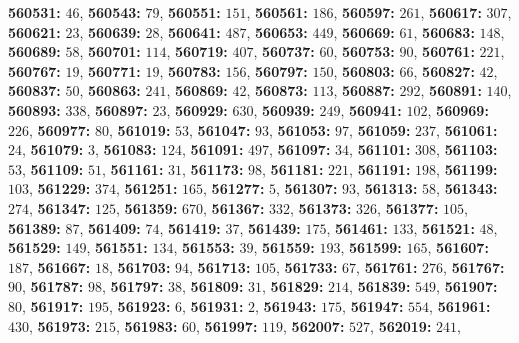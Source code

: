\textsf{\bfseries 560531:} $46$, \textsf{\bfseries 560543:} $79$, \textsf{\bfseries 560551:} $151$, \textsf{\bfseries 560561:} $186$, \textsf{\bfseries 560597:} $261$, \textsf{\bfseries 560617:} $307$, \textsf{\bfseries 560621:} $23$, \textsf{\bfseries 560639:} $28$, \textsf{\bfseries 560641:} $487$, \textsf{\bfseries 560653:} $449$, \textsf{\bfseries 560669:} $61$, \textsf{\bfseries 560683:} $148$, \textsf{\bfseries 560689:} $58$, \textsf{\bfseries 560701:} $114$, \textsf{\bfseries 560719:} $407$, \textsf{\bfseries 560737:} $60$, \textsf{\bfseries 560753:} $90$, \textsf{\bfseries 560761:} $221$, \textsf{\bfseries 560767:} $19$, \textsf{\bfseries 560771:} $19$, \textsf{\bfseries 560783:} $156$, \textsf{\bfseries 560797:} $150$, \textsf{\bfseries 560803:} $66$, \textsf{\bfseries 560827:} $42$, \textsf{\bfseries 560837:} $50$, \textsf{\bfseries 560863:} $241$, \textsf{\bfseries 560869:} $42$, \textsf{\bfseries 560873:} $113$, \textsf{\bfseries 560887:} $292$, \textsf{\bfseries 560891:} $140$, \textsf{\bfseries 560893:} $338$, \textsf{\bfseries 560897:} $23$, \textsf{\bfseries 560929:} $630$, \textsf{\bfseries 560939:} $249$, \textsf{\bfseries 560941:} $102$, \textsf{\bfseries 560969:} $226$, \textsf{\bfseries 560977:} $80$, \textsf{\bfseries 561019:} $53$, \textsf{\bfseries 561047:} $93$, \textsf{\bfseries 561053:} $97$, \textsf{\bfseries 561059:} $237$, \textsf{\bfseries 561061:} $24$, \textsf{\bfseries 561079:} $3$, \textsf{\bfseries 561083:} $124$, \textsf{\bfseries 561091:} $497$, \textsf{\bfseries 561097:} $34$, \textsf{\bfseries 561101:} $308$, \textsf{\bfseries 561103:} $53$, \textsf{\bfseries 561109:} $51$, \textsf{\bfseries 561161:} $31$, \textsf{\bfseries 561173:} $98$, \textsf{\bfseries 561181:} $221$, \textsf{\bfseries 561191:} $198$, \textsf{\bfseries 561199:} $103$, \textsf{\bfseries 561229:} $374$, \textsf{\bfseries 561251:} $165$, \textsf{\bfseries 561277:} $5$, \textsf{\bfseries 561307:} $93$, \textsf{\bfseries 561313:} $58$, \textsf{\bfseries 561343:} $274$, \textsf{\bfseries 561347:} $125$, \textsf{\bfseries 561359:} $670$, \textsf{\bfseries 561367:} $332$, \textsf{\bfseries 561373:} $326$, \textsf{\bfseries 561377:} $105$, \textsf{\bfseries 561389:} $87$, \textsf{\bfseries 561409:} $74$, \textsf{\bfseries 561419:} $37$, \textsf{\bfseries 561439:} $175$, \textsf{\bfseries 561461:} $133$, \textsf{\bfseries 561521:} $48$, \textsf{\bfseries 561529:} $149$, \textsf{\bfseries 561551:} $134$, \textsf{\bfseries 561553:} $39$, \textsf{\bfseries 561559:} $193$, \textsf{\bfseries 561599:} $165$, \textsf{\bfseries 561607:} $187$, \textsf{\bfseries 561667:} $18$, \textsf{\bfseries 561703:} $94$, \textsf{\bfseries 561713:} $105$, \textsf{\bfseries 561733:} $67$, \textsf{\bfseries 561761:} $276$, \textsf{\bfseries 561767:} $90$, \textsf{\bfseries 561787:} $98$, \textsf{\bfseries 561797:} $38$, \textsf{\bfseries 561809:} $31$, \textsf{\bfseries 561829:} $214$, \textsf{\bfseries 561839:} $549$, \textsf{\bfseries 561907:} $80$, \textsf{\bfseries 561917:} $195$, \textsf{\bfseries 561923:} $6$, \textsf{\bfseries 561931:} $2$, \textsf{\bfseries 561943:} $175$, \textsf{\bfseries 561947:} $554$, \textsf{\bfseries 561961:} $430$, \textsf{\bfseries 561973:} $215$, \textsf{\bfseries 561983:} $60$, \textsf{\bfseries 561997:} $119$, \textsf{\bfseries 562007:} $527$, \textsf{\bfseries 562019:} $241$, 
